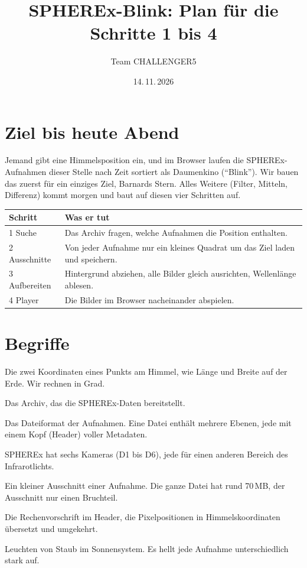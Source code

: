 \documentclass[11pt,a4paper]{article}
\title{\color{akzent}\textbf{SPHEREx-Blink: Plan für die Schritte 1 bis 4}}
\author{Team CHALLENGER5}
\date{14.\,11.\,2026}
\begin{document}
\maketitle

\section*{Ziel bis heute Abend}

Jemand gibt eine Himmelsposition ein, und im Browser laufen die SPHEREx-Aufnahmen
dieser Stelle nach Zeit sortiert als Daumenkino ("`Blink"'). Wir bauen das zuerst
für ein einziges Ziel, Barnards Stern. Alles Weitere (Filter, Mitteln, Differenz)
kommt morgen und baut auf diesen vier Schritten auf.

\begin{center}
\begin{tabularx}{\textwidth}{@{}lX@{}}
\toprule
\textbf{Schritt} & \textbf{Was er tut} \\
\midrule
1 Suche & Das Archiv fragen, welche Aufnahmen die Position enthalten. \\
2 Ausschnitte & Von jeder Aufnahme nur ein kleines Quadrat um das Ziel laden und speichern. \\
3 Aufbereiten & Hintergrund abziehen, alle Bilder gleich ausrichten, Wellenlänge ablesen. \\
4 Player & Die Bilder im Browser nacheinander abspielen. \\
\bottomrule
\end{tabularx}
\end{center}

\section*{Begriffe}

\begin{description}[leftmargin=3cm,style=nextline,itemsep=1pt]
\item[RA, Dec] Die zwei Koordinaten eines Punkts am Himmel, wie Länge und Breite auf der Erde. Wir rechnen in Grad.
\item[IRSA] Das Archiv, das die SPHEREx-Daten bereitstellt.
\item[FITS-Datei] Das Dateiformat der Aufnahmen. Eine Datei enthält mehrere Ebenen, jede mit einem Kopf (Header) voller Metadaten.
\item[Detektor] SPHEREx hat sechs Kameras (D1 bis D6), jede für einen anderen Bereich des Infrarotlichts.
\item[Cutout] Ein kleiner Ausschnitt einer Aufnahme. Die ganze Datei hat rund 70\,MB, der Ausschnitt nur einen Bruchteil.
\item[WCS] Die Rechenvorschrift im Header, die Pixelpositionen in Himmelskoordinaten übersetzt und umgekehrt.
\item[Zodiakallicht] Leuchten von Staub im Sonnensystem. Es hellt jede Aufnahme unterschiedlich stark auf.
\end{description}
\end{document}
